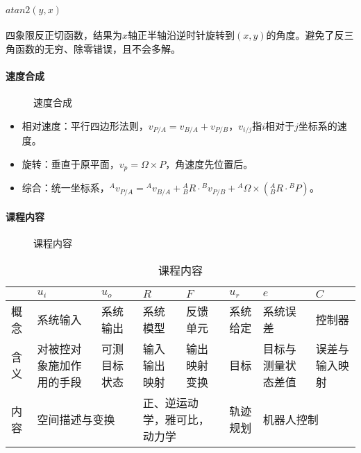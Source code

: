 \documentclass[
12pt, %
a4paper, 
oneside, %
headinclude,footinclude, %
]{scrartcl}
\begin{document}
\paragraph{$ atan2(y, x) $}
四象限反正切函数，结果为$ x $轴正半轴沿逆时针旋转到$ (x, y) $的角度。避免了反三角函数的无穷、除零错误，且不会多解。
\paragraph{速度合成}
\begin{figure}[H]
\centering
{} \quad
{}
\caption{速度合成}
\end{figure}

\begin{itemize}
\item 相对速度：平行四边形法则，$ v_{P/A} = v_{B/A} + v_{P/B} $，$ v_{i/j} $指$ i $相对于$ j $坐标系的速度。
\item 旋转：垂直于原平面，$ v_p = \Omega \times P $，角速度先位置后。
\item 综合：统一坐标系，$ {}^A v_{P/A} = {}^A v_{B/A} + {}^A_B R \cdot {}^B v_{P/B} + {}^A \Omega \times ({}^A_B R \cdot {}^B P) $。
\end{itemize}
\paragraph{课程内容}
\begin{figure}[H]
\centering
{} \quad
{}
\caption{课程内容}
\end{figure}

\begin{table}[H]
\centering
\begin{tabular}{|p{0.9cm}|p{2cm}|p{2cm}|p{2cm}|p{2cm}|p{2cm}|p{2cm}|p{2cm}|}
\hline
& $ u_i $ & $ u_o $ & $ R $ & $ F $ & $ u_r $ & $ e $ & $ C $ \\
\hline
概念 & 系统输入 & 系统输出 & 系统模型 & 反馈单元 & 系统给定 & 系统误差 & 控制器 \\
\hline
含义 & 对被控对象施加作用的手段 & 可测目标状态 & 输入输出映射 & 输出映射变换 & 目标 & 目标与测量状态差值 & 误差与输入映射 \\
\hline
内容 & \multicolumn{2}{l|}{空间描述与变换} & \multicolumn{2}{p{4cm}|}{正、逆运动学，雅可比，动力学} & 轨迹规划 & \multicolumn{2}{l|}{机器人控制} \\
\hline
\end{tabular}
\caption{课程内容}
\end{table}
\end{document}
